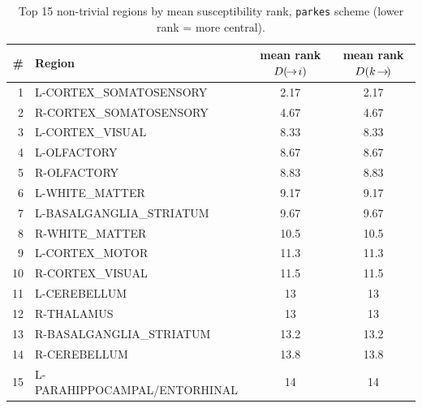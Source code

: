 \begin{table}[H]\centering\small
\caption{Top 15 non-trivial regions by mean susceptibility rank, \texttt{parkes} scheme (lower rank = more central).}
\begin{tabular}{@{}rlcc@{}}\toprule
\# & Region & mean rank $D(\!\to\! i)$ & mean rank $D(k\!\to\!)$ \\\midrule
1 & L-CORTEX\_SOMATOSENSORY & 2.17 & 2.17 \\
2 & R-CORTEX\_SOMATOSENSORY & 4.67 & 4.67 \\
3 & L-CORTEX\_VISUAL & 8.33 & 8.33 \\
4 & L-OLFACTORY & 8.67 & 8.67 \\
5 & R-OLFACTORY & 8.83 & 8.83 \\
6 & L-WHITE\_MATTER & 9.17 & 9.17 \\
7 & L-BASALGANGLIA\_STRIATUM & 9.67 & 9.67 \\
8 & R-WHITE\_MATTER & 10.5 & 10.5 \\
9 & L-CORTEX\_MOTOR & 11.3 & 11.3 \\
10 & R-CORTEX\_VISUAL & 11.5 & 11.5 \\
11 & L-CEREBELLUM & 13 & 13 \\
12 & R-THALAMUS & 13 & 13 \\
13 & R-BASALGANGLIA\_STRIATUM & 13.2 & 13.2 \\
14 & R-CEREBELLUM & 13.8 & 13.8 \\
15 & L-PARAHIPPOCAMPAL/ENTORHINAL & 14 & 14 \\
\bottomrule\end{tabular}\end{table}
